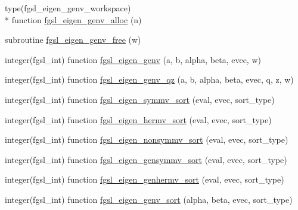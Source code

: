 \begin{DoxyCompactItemize}
\item 
type(fgsl\-\_\-eigen\-\_\-genv\-\_\-workspace) \\*
function \hyperlink{eigen_8finc_ad5f5628460ae023f294684dc0d2b001c}{fgsl\-\_\-eigen\-\_\-genv\-\_\-alloc} (n)
\item 
subroutine \hyperlink{eigen_8finc_af448040f311f66e9ed9f1e86d6ee8abb}{fgsl\-\_\-eigen\-\_\-genv\-\_\-free} (w)
\item 
integer(fgsl\-\_\-int) function \hyperlink{eigen_8finc_a091964d484996dc36d814dd6f7024885}{fgsl\-\_\-eigen\-\_\-genv} (a, b, alpha, beta, evec, w)
\item 
integer(fgsl\-\_\-int) function \hyperlink{eigen_8finc_ade5191d945be9be6f404d55ce96013c0}{fgsl\-\_\-eigen\-\_\-genv\-\_\-qz} (a, b, alpha, beta, evec, q, z, w)
\item 
integer(fgsl\-\_\-int) function \hyperlink{eigen_8finc_a4de96323ca5ee27e595f0ccc55686200}{fgsl\-\_\-eigen\-\_\-symmv\-\_\-sort} (eval, evec, sort\-\_\-type)
\item 
integer(fgsl\-\_\-int) function \hyperlink{eigen_8finc_a3367196fe5ce83a49332525cf10513ad}{fgsl\-\_\-eigen\-\_\-hermv\-\_\-sort} (eval, evec, sort\-\_\-type)
\item 
integer(fgsl\-\_\-int) function \hyperlink{eigen_8finc_a225c50506c2ef39bf0eb7efdf3d7bd29}{fgsl\-\_\-eigen\-\_\-nonsymmv\-\_\-sort} (eval, evec, sort\-\_\-type)
\item 
integer(fgsl\-\_\-int) function \hyperlink{eigen_8finc_a01fa1634183b5dd7727164f67160ee20}{fgsl\-\_\-eigen\-\_\-gensymmv\-\_\-sort} (eval, evec, sort\-\_\-type)
\item 
integer(fgsl\-\_\-int) function \hyperlink{eigen_8finc_aedab09666f98dd918fc64875cda7c972}{fgsl\-\_\-eigen\-\_\-genhermv\-\_\-sort} (eval, evec, sort\-\_\-type)
\item 
integer(fgsl\-\_\-int) function \hyperlink{eigen_8finc_a277ee7050a1e674988a7392ac9255d21}{fgsl\-\_\-eigen\-\_\-genv\-\_\-sort} (alpha, beta, evec, sort\-\_\-type)
\end{DoxyCompactItemize}


